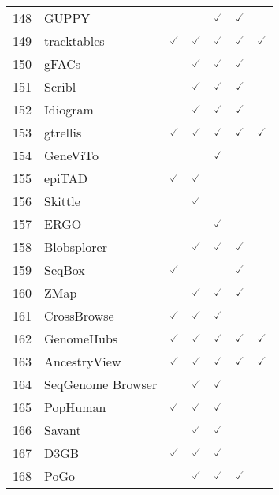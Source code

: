 \documentclass[10pt,letterpaper]{article}
\begin{document}
\begin{table}[!ht]
\begin{adjustwidth}{-2.25in}{0in}
\begin{tabular}{|c|l|c|c|c|c|c|}
148 & GUPPY\cite{ueno2003processing} & & & $\checked$ & $\checked$ & \\
149 & tracktables\cite{rintoul2015trackable} & $\checked$ & $\checked$ & $\checked$ & $\checked$ & $\checked$  \\ 
150 & gFACs\cite{caballero2018gfacs} & & $\checked$ & $\checked$ & $\checked$ & \\ 
151 & Scribl\cite{miller2012scribl} & & $\checked$ & $\checked$ & $\checked$ & \\ 
152 & Idiogram\cite{matsuura1935contributions} & & $\checked$ & $\checked$ & $\checked$ & \\ 
153 & gtrellis\cite{gu2016gtrellis} & $\checked$ & $\checked$ & $\checked$ & $\checked$ & $\checked$  \\ 
154 & GeneViTo\cite{vernikos2003genevito} & & & $\checked$ & & \\
155 & epiTAD\cite{creed2018epitad} & $\checked$ & $\checked$ & & & \\
156 & Skittle\cite{seaman2009skittle} & & $\checked$ & & & \\
157 & ERGO\cite{lenggenhager2007video} & & & $\checked$ & & \\
158 & Blobsplorer\cite{kumar2013blobology} & & $\checked$ & $\checked$ & $\checked$ & \\ 
159 & SeqBox\cite{beccuti2017seqbox} & $\checked$ & & & $\checked$ & \\
160 & ZMap\cite{wiemer2001software} & & $\checked$ & $\checked$ & $\checked$ & \\
161 & CrossBrowse\cite{shenker2018crossbrowse} & $\checked$ & $\checked$ & $\checked$ & & \\
162 & GenomeHubs\cite{challis2017genomehubs} & $\checked$ & $\checked$ & $\checked$ & $\checked$ & $\checked$  \\ 
163 & AncestryView\cite{zhao2018ancestryview} & $\checked$ & $\checked$ & $\checked$ & $\checked$ & $\checked$  \\ 
164 & SeqGenome Browser\cite{michel2013gwips} & & $\checked$ & $\checked$ & & \\
165 & PopHuman\cite{casillas2017pophuman} & $\checked$ & $\checked$ & $\checked$ & & \\
166 & Savant\cite{fiume2010savant} & & $\checked$ & $\checked$ & & \\
167 & D3GB\cite{barrios2017d3gb} & $\checked$ & $\checked$ & $\checked$ & & \\
168 & PoGo\cite{schlaffner2016pogo} & & $\checked$ & $\checked$ & $\checked$ & \\

\end{tabular}
\end{adjustwidth}
\end{table}
\end{document}
